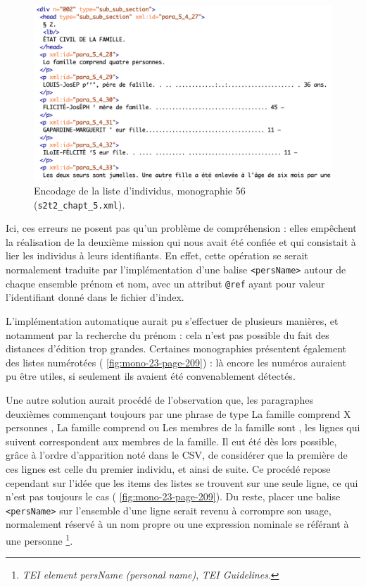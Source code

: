 \begin{figure}[ht]
    \includegraphics[width=14cm]{img/mono-56-page-4-code.png}
    \caption[Encodage de la liste d'individus (\no{}56)]{Encodage de la liste d'individus, monographie \no{}56 (\texttt{s2t2\_chapt\_5.xml}).}
    \label{fig:mono-56-page-4-code}
\end{figure}

Ici, ces erreurs ne posent pas qu'un problème de compréhension : elles empêchent la réalisation de la deuxième mission qui nous avait été confiée et qui consistait à lier les individus à leurs identifiants. En effet, cette opération se serait normalement traduite par l'implémentation d'une balise \texttt{<persName>} autour de chaque ensemble prénom et nom, avec un attribut \texttt{@ref} ayant pour valeur l'identifiant donné dans le fichier d'index.

L'implémentation automatique aurait pu s'effectuer de plusieurs manières, et notamment par la recherche du prénom : cela n'est pas possible du fait des distances d'édition trop grandes. Certaines monographies présentent également des listes numérotées (\fig{} \ref{fig:mono-23-page-209}) : là encore les numéros auraient pu être utiles, si seulement ils avaient été convenablement détectés.

\bigbreak

Une autre solution aurait procédé de l'observation que, les paragraphes deuxièmes commençant toujours par une phrase de type \og La famille comprend X personnes \fg{}, \og La famille comprend \fg{} ou \og Les membres de la famille sont \fg{}, les lignes qui suivent correspondent aux membres de la famille. Il eut été dès lors possible, grâce à l'ordre d'apparition noté dans le CSV, de considérer que la première de ces lignes est celle du premier individu, et ainsi de suite. Ce procédé repose cependant sur l'idée que les items des listes se trouvent sur une seule ligne, ce qui n'est pas toujours le cas (\fig{} \ref{fig:mono-23-page-209}). Du reste, placer une balise \texttt{<persName>} sur l'ensemble d'une ligne serait revenu à corrompre son usage, normalement réservé à \og un nom propre ou une expression nominale se référant à une personne \fg{}\footnote{\textit{TEI element persName (personal name)}, \textit{TEI Guidelines}.}.


